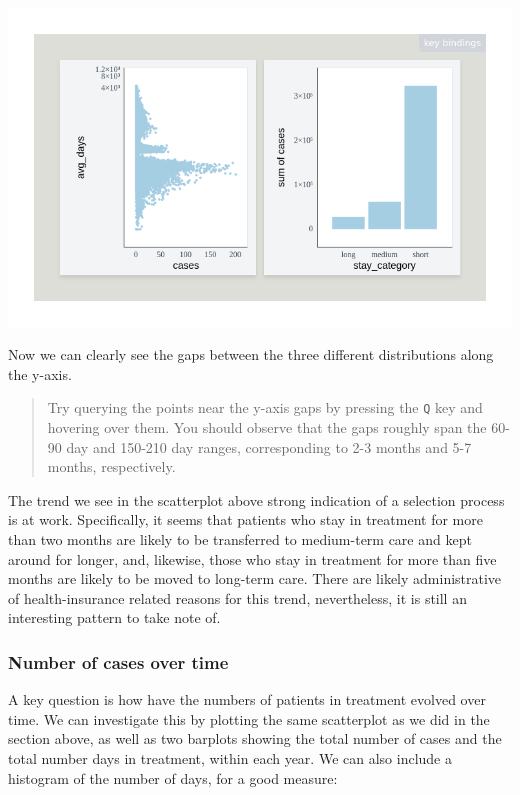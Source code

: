 \documentclass[
]{book}
\theoremstyle{definition}
\theoremstyle{definition}
\theoremstyle{definition}
\theoremstyle{definition}
\theoremstyle{remark}
\begin{document}
\begin{center}\includegraphics[width=1\linewidth,height=1\textheight]{./figures/example-cases-avg-days} \end{center}

Now we can clearly see the gaps between the three different distributions along the y-axis.

\begin{quote}
Try querying the points near the y-axis gaps by pressing the \texttt{Q} key and hovering over them. You should observe that the gaps roughly span the 60-90 day and 150-210 day ranges, corresponding to 2-3 months and 5-7 months, respectively.
\end{quote}

The trend we see in the scatterplot above strong indication of a selection process is at work. Specifically, it seems that patients who stay in treatment for more than two months are likely to be transferred to medium-term care and kept around for longer, and, likewise, those who stay in treatment for more than five months are likely to be moved to long-term care. There are likely administrative of health-insurance related reasons for this trend, nevertheless, it is still an interesting pattern to take note of.

\subsubsection{Number of cases over time}\label{number-of-cases-over-time}

A key question is how have the numbers of patients in treatment evolved over time. We can investigate this by plotting the same scatterplot as we did in the section above, as well as two barplots showing the total number of cases and the total number days in treatment, within each year. We can also include a histogram of the number of days, for a good measure:
\end{document}

